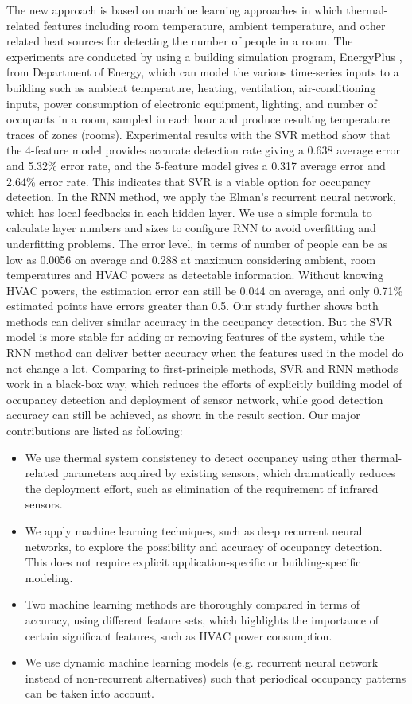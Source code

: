 The new approach is based on machine learning
  approaches in which thermal-related features including room
  temperature, ambient temperature, and other related heat sources for
  detecting the number of people in a room.  The experiments are
  conducted by using a building simulation program,
  EnergyPlus \cite{energyplus:2001vf}, from Department of Energy,
  which can model the various time-series inputs to a building such as
  ambient temperature, heating, ventilation, air-conditioning
  inputs, power consumption of electronic equipment, lighting, and
  number of occupants in a room, sampled in each hour and produce
  resulting temperature traces of zones (rooms).  Experimental
results with the SVR method show that the 4-feature model provides accurate
detection rate giving a 0.638 average error and 5.32\% error rate, and
the 5-feature model gives a 0.317 average error and 2.64\% error
rate. This indicates that SVR is a viable option for occupancy
detection.  In the RNN method, we apply the Elman's recurrent neural
network, which has local feedbacks in each hidden layer. We use a simple
formula to calculate layer numbers and sizes to configure RNN
to avoid overfitting and underfitting problems. The error
level, in terms of number of people can be as low as 0.0056 on average
and 0.288 at maximum considering ambient, room temperatures and HVAC
powers as detectable information. Without knowing HVAC powers, the
estimation error can still be 0.044 on average, and only 0.71\%
estimated points have errors greater than 0.5. Our study further shows
both methods can deliver similar accuracy in the occupancy
detection. But the SVR model is more stable for
  adding or removing features of the system, while the RNN method can
  deliver better accuracy when the features used in the model do not
  change a lot. Comparing to first-principle methods, SVR and
  RNN methods work in a black-box way, which reduces the efforts of
  explicitly building model of occupancy detection and deployment of sensor
  network, while good detection accuracy can still be achieved, as shown in the
  result section. Our major contributions are listed as
  following:
\begin{itemize}
\item We use thermal system consistency to detect occupancy using other
    thermal-related parameters acquired by existing sensors, which dramatically
    reduces the deployment effort, such as elimination of the requirement
    of infrared sensors.
\item We apply machine learning techniques, such as deep recurrent neural
    networks, to explore the possibility and accuracy of occupancy detection.
    This does not require explicit application-specific or building-specific
    modeling.
\item Two machine learning methods are thoroughly compared in terms of accuracy,
    using different feature sets, which highlights the importance of certain
    significant features, such as HVAC power consumption.
\item We use dynamic machine learning models (e.g. recurrent neural network
    instead of non-recurrent alternatives) such that periodical occupancy
    patterns can be taken into account.
\end{itemize}


